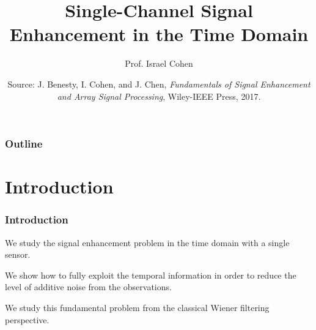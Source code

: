 \documentclass[10pt,pdflatex,headrule,landscape]{beamer}
\title[Single-Channel Enhancement: Time Domain \insertframenumber $\backslash$\inserttotalframenumber]{Single-Channel Signal Enhancement in the Time Domain}
\author[Prof. Israel Cohen]{Prof. Israel Cohen}
\institute[SFU]{%
   Department of Electrical Engineering \\
Technion - Israel Institute of Technology \\
Technion City, Haifa 3200003, Israel
}
\date[] %
{\footnotesize Source: J. Benesty, I. Cohen, and J. Chen, \textit{Fundamentals of Signal Enhancement and Array Signal Processing}, Wiley-IEEE Press, 2017.}
\begin{document}
\begin{frame}
  \titlepage
\end{frame}



\begin{frame}
  \frametitle{Outline}
  \tableofcontents[hideallsubsections]
\end{frame}

\setlength{\parskip}{1em}

\section{Introduction}
\begin{frame}
    \frametitle{Introduction}

We study the signal enhancement problem in the time domain with a single sensor.

We show how to fully exploit the temporal information in order to reduce the level of additive noise from the observations.

We study this fundamental problem from the classical Wiener filtering perspective.

\end{frame}
\end{document}
